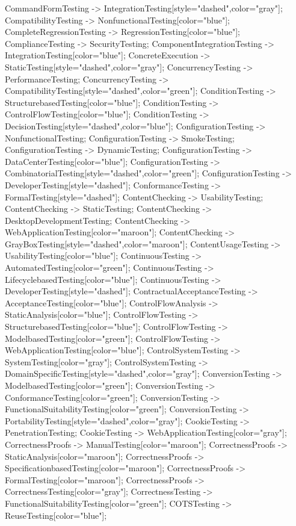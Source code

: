 \documentclass{article}
\begin{document}
{CommandFormTesting -> IntegrationTesting[style="dashed",color="gray"];
CompatibilityTesting -> NonfunctionalTesting[color="blue"];
CompleteRegressionTesting -> RegressionTesting[color="blue"];
ComplianceTesting -> SecurityTesting;
ComponentIntegrationTesting -> IntegrationTesting[color="blue"];
ConcreteExecution -> StaticTesting[style="dashed",color="gray"];
ConcurrencyTesting -> PerformanceTesting;
ConcurrencyTesting -> CompatibilityTesting[style="dashed",color="green"];
ConditionTesting -> StructurebasedTesting[color="blue"];
ConditionTesting -> ControlFlowTesting[color="blue"];
ConditionTesting -> DecisionTesting[style="dashed",color="blue"];
ConfigurationTesting -> NonfunctionalTesting;
ConfigurationTesting -> SmokeTesting;
ConfigurationTesting -> DynamicTesting;
ConfigurationTesting -> DataCenterTesting[color="blue"];
ConfigurationTesting -> CombinatorialTesting[style="dashed",color="green"];
ConfigurationTesting -> DeveloperTesting[style="dashed"];
ConformanceTesting -> FormalTesting[style="dashed"];
ContentChecking -> UsabilityTesting;
ContentChecking -> StaticTesting;
ContentChecking -> DesktopDevelopmentTesting;
ContentChecking -> WebApplicationTesting[color="maroon"];
ContentChecking -> GrayBoxTesting[style="dashed",color="maroon"];
ContentUsageTesting -> UsabilityTesting[color="blue"];
ContinuousTesting -> AutomatedTesting[color="green"];
ContinuousTesting -> LifecyclebasedTesting[color="blue"];
ContinuousTesting -> DeveloperTesting[style="dashed"];
ContractualAcceptanceTesting -> AcceptanceTesting[color="blue"];
ControlFlowAnalysis -> StaticAnalysis[color="blue"];
ControlFlowTesting -> StructurebasedTesting[color="blue"];
ControlFlowTesting -> ModelbasedTesting[color="green"];
ControlFlowTesting -> WebApplicationTesting[color="blue"];
ControlSystemTesting -> SystemTesting[color="gray"];
ControlSystemTesting -> DomainSpecificTesting[style="dashed",color="gray"];
ConversionTesting -> ModelbasedTesting[color="green"];
ConversionTesting -> ConformanceTesting[color="green"];
ConversionTesting -> FunctionalSuitabilityTesting[color="green"];
ConversionTesting -> PortabilityTesting[style="dashed",color="gray"];
CookieTesting -> PenetrationTesting;
CookieTesting -> WebApplicationTesting[color="gray"];
CorrectnessProofs -> ManualTesting[color="maroon"];
CorrectnessProofs -> StaticAnalysis[color="maroon"];
CorrectnessProofs -> SpecificationbasedTesting[color="maroon"];
CorrectnessProofs -> FormalTesting[color="maroon"];
CorrectnessProofs -> CorrectnessTesting[color="gray"];
CorrectnessTesting -> FunctionalSuitabilityTesting[color="green"];
COTSTesting -> ReuseTesting[color="blue"];
}
\end{document}
